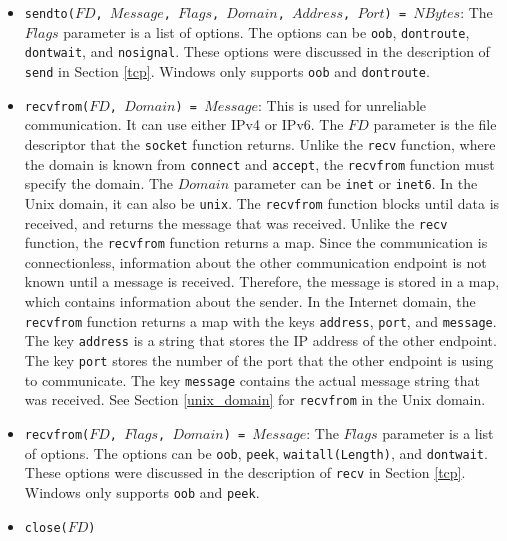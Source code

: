 \begin{itemize}
\item \texttt{sendto($FD$, $Message$, $Flags$, $Domain$, $Address$, $Port$) = $NBytes$}: The $Flags$ parameter is a list of options. The options can be \texttt{oob}, \texttt{dontroute}, \texttt{dontwait}, and \texttt{nosignal}.  These options were discussed in the description of \texttt{send} in Section \ref{tcp}.  Windows only supports \texttt{oob} and \texttt{dontroute}.
\item \texttt{recvfrom($FD$, $Domain$) = $Message$}: This is used for unreliable communication.  It can use either IPv4 or IPv6.  The $FD$ parameter is the file descriptor that the \texttt{socket} function returns.  Unlike the \texttt{recv} function, where the domain is known from \texttt{connect} and \texttt{accept}, the \texttt{recvfrom} function must specify the domain.  The $Domain$ parameter can be \texttt{inet} or \texttt{inet6}.  In the Unix domain, it can also be \texttt{unix}.  The \texttt{recvfrom} function blocks until data is received, and returns the message that was received.  Unlike the \texttt{recv} function, the \texttt{recvfrom} function returns a map.  Since the communication is connectionless, information about the other communication endpoint is not known until a message is received.  Therefore, the message is stored in a map, which contains information about the sender.  In the Internet domain, the \texttt{recvfrom} function returns a map with the keys \texttt{address}, \texttt{port}, and \texttt{message}.  The key \texttt{address} is a string that stores the IP address of the other endpoint.  The key \texttt{port} stores the number of the port that the other endpoint is using to communicate.  The key \texttt{message} contains the actual message string that was received.  See Section \ref{unix_domain} for \texttt{recvfrom} in the Unix domain.
\item \texttt{recvfrom($FD$, $Flags$, $Domain$) = $Message$}:  The $Flags$ parameter is a list of options.  The options can be \texttt{oob}, \texttt{peek}, \texttt{waitall(Length)}, and \texttt{dontwait}.  These options were discussed in the description of \texttt{recv} in Section \ref{tcp}.  Windows only supports \texttt{oob} and \texttt{peek}.
\item \texttt{close($FD$)}
\end{itemize}

